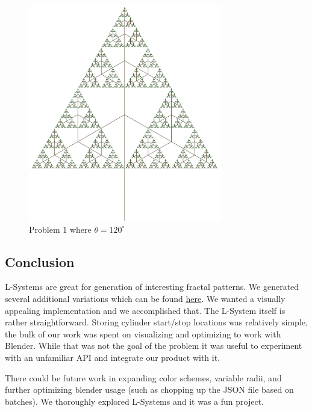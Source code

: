 \begin{figure}[H]
    \centering
    \includegraphics[width=0.75\textwidth]{figures/L-systems/prob1-120}
    \caption{Problem 1 where $\theta = 120^\circ$}\label{fig:prob1_120}
\end{figure}




\subsection{Conclusion}
L-Systems are great for generation of interesting fractal patterns. We
generated several additional variations which can be found
\href{https://sketchfab.com/macattackftw/models}{here}. We wanted a visually
appealing implementation and we accomplished that. The L-System itself is
rather straightforward. Storing cylinder start/stop locations was relatively
simple, the bulk of our work was spent on visualizing and optimizing to work
with Blender. While that was not the goal of the problem it was useful to
experiment with an unfamiliar API and integrate our product with it.

There could be future work in expanding color schemes, variable radii, and
further optimizing blender usage (such as chopping up the JSON file based on
batches). We thoroughly explored L-Systems and it was a fun project.
